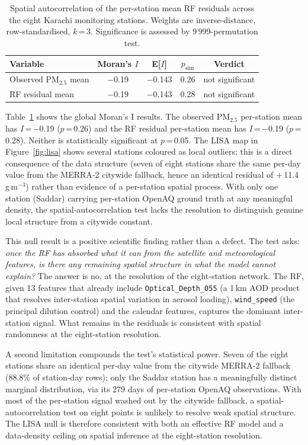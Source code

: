\documentclass{iopjournal}
\begin{document}
\begin{table}
\caption{Spatial autocorrelation of the per-station mean RF
residuals across the eight Karachi monitoring stations. Weights
are inverse-distance, row-standardised, $k$\,=\,3. Significance
is assessed by 9\,999-permutation test.}
\centering
\begin{tabular}{l c c c c}
\hline
Variable              & Moran's $I$ & E[$I$]   & $p_{\mathrm{sim}}$ & Verdict \\
\hline
Observed PM$_{2.5}$ mean  & $-$0.19 & $-$0.143 & 0.26 & not significant \\
RF residual mean          & $-$0.19 & $-$0.143 & 0.28 & not significant \\
\hline
\end{tabular}
\label{tab:moran}
\end{table}

Table~\ref{tab:moran} shows the global Moran's I results. The
observed PM$_{2.5}$ per-station mean has $I$\,=\,$-$0.19
($p$\,=\,0.26) and the RF residual per-station mean has
$I$\,=\,$-$0.19 ($p$\,=\,0.28). Neither is statistically
significant at $p$\,=\,0.05. The LISA map in
Figure~\ref{fig:lisa} shows several stations coloured as local
outliers; this is a direct consequence of the data structure
(seven of eight stations share the same per-day value from the
MERRA-2 citywide fallback, hence an identical residual of
$+$\,11.4\,\textmu g\,m$^{-3}$) rather than evidence of a
per-station spatial process. With only one station (Saddar) carrying
per-station OpenAQ ground truth at any meaningful density, the
spatial-autocorrelation test lacks the resolution to distinguish
genuine local structure from a citywide constant.

This null result is a positive scientific finding rather than a
defect. The test asks: \emph{once the RF has absorbed what it can
from the satellite and meteorological features, is there any
remaining spatial structure in what the model cannot explain?}
The answer is no, at the resolution of the eight-station network.
The RF, given 13 features that already include
\texttt{Optical\_Depth\_055} (a 1\,km AOD product that resolves
inter-station spatial variation in aerosol loading),
\texttt{wind\_speed} (the principal dilution control) and the
calendar features, captures the dominant inter-station signal.
What remains in the residuals is consistent with spatial
randomness at the eight-station resolution.

A second limitation compounds the test's statistical power. Seven
of the eight stations share an identical per-day value from the
citywide MERRA-2 fallback (88.8\% of station-day rows); only the
Saddar station has a meaningfully distinct marginal distribution,
via its 279 days of per-station OpenAQ observations. With most
of the per-station signal washed out by the citywide fallback, a
spatial-autocorrelation test on eight points is unlikely to
resolve weak spatial structure. The LISA null is therefore
consistent with both an effective RF model and a data-density
ceiling on spatial inference at the eight-station resolution.
\end{document}

